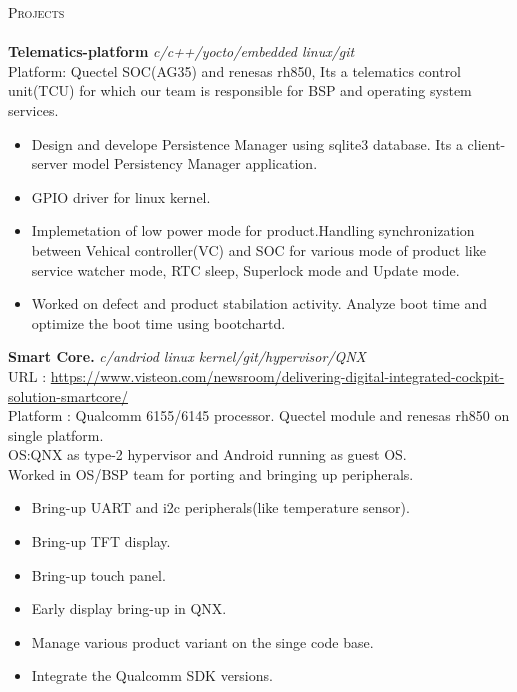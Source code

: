 \documentclass[a4paper]{article}
\newcommand{\lineunder} {
    \vspace*{-8pt} \\
    \hspace*{-18pt} \hrulefill \\
}
\newcommand{\header} [1] {
    {\hspace*{-18pt}\vspace*{6pt} \textsc{#1}}
    \vspace*{-6pt} \lineunder
}
\begin{document}
\header{Projects}
{\textbf{Telematics-platform}} {\sl c/c++/yocto/embedded linux/git} \\
Platform: Quectel SOC(AG35) and renesas rh850, Its a telematics control unit(TCU) for which our team is responsible for BSP and operating system services.\\ 
\begin{itemize} \itemsep 0.5pt
\item Design and develope Persistence Manager using sqlite3 database. Its a client-server model Persistency Manager application.
\item GPIO driver for linux kernel.
\item Implemetation of low power mode for product.Handling synchronization between Vehical controller(VC) and SOC for various mode of product like service watcher mode, RTC sleep, Superlock mode and Update mode.
\item Worked on defect and product stabilation activity. Analyze boot time and optimize the boot time using bootchartd.
\end{itemize}
\vspace*{2mm}

{\textbf{Smart Core.}} {\sl c/andriod linux kernel/git/hypervisor/QNX} \\ 
URL : \url{https://www.visteon.com/newsroom/delivering-digital-integrated-cockpit-solution-smartcore/} \\
\vspace*{1mm}
Platform : Qualcomm 6155/6145 processor. Quectel module and renesas rh850 on single platform.\\
OS:QNX as type-2 hypervisor and Android running as guest OS. \\ Worked in OS/BSP team for porting and bringing up peripherals. \\
\begin{itemize} \itemsep 0.5pt
\item Bring-up UART and i2c peripherals(like temperature sensor).
\item Bring-up TFT display. 
\item Bring-up touch panel.
\item Early display bring-up in QNX.
\item Manage various product variant on the singe code base.
\item Integrate the Qualcomm SDK versions.
\end{itemize}
\vspace*{2mm}
\end{document}
